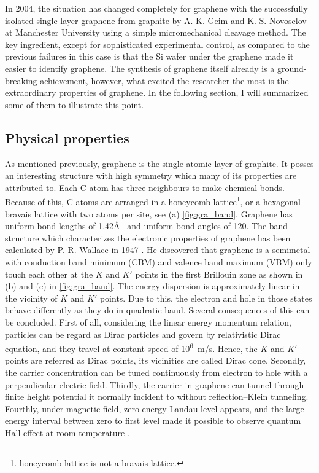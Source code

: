 In 2004, the situation has changed completely for graphene with the successfully isolated single layer graphene from graphite by A. K. Geim and K. S. Novoselov at Manchester University using a simple micromechanical cleavage method. The key ingredient, except for sophisticated experimental control, as compared to the previous failures\cite{Krishnan1997,Ohashi1997} in this case is that the Si wafer under the graphene made it easier to identify graphene\cite{Geim2007}. The synthesis of graphene itself already is a ground-breaking achievement, however, what excited the researcher the most is the extraordinary properties of graphene. In the following section, I will summarized some of them to illustrate this point.

\subsection{Physical properties}

As mentioned previously, graphene is the single atomic layer of graphite. It posses an interesting structure with high symmetry which many of its properties are attributed to. Each C atom has three neighbours to make chemical bonds. Because of this, C atoms are arranged in a honeycomb lattice\footnote{honeycomb lattice is not a bravais lattice.}, or a hexagonal bravais lattice with two atoms per site, see (a) \autoref{fig:gra_band}. Graphene has uniform bond lengths of 1.42\AA~ and uniform bond angles of 120\textdegree. The band structure which characterizes the electronic properties of graphene has been calculated by P. R. Wallace in 1947 \cite{Wallace1947}. He discovered that graphene is a semimetal with conduction band minimum (CBM) and valence band maximum (VBM) only touch each other at the $K$ and $K'$ points in the first Brillouin zone as shown in (b) and (c) in \autoref{fig:gra_band}. The energy dispersion is approximately linear in the vicinity of $K$ and $K'$ points. Due to this, the electron and hole in those states behave differently as they do in quadratic band. Several consequences of this can be concluded. First of all, considering the linear energy momentum relation, particles can be regard as Dirac particles and govern by relativistic Dirac equation\cite{Novoselov2005}, and they travel at constant speed of \si{10^6m/s}. Hence, the $K$ and $K'$ points are referred as Dirac points, its vicinities are called Dirac cone. Secondly, the carrier concentration can be tuned continuously from electron to hole with a perpendicular electric field\cite{Geim2007}. Thirdly, the carrier in graphene can tunnel through finite height potential it normally incident to without reflection--Klein tunneling\cite{Katsnelson2006}. Fourthly, under magnetic field, zero energy Landau level appears, and the large energy interval between zero to first level made it possible to observe quantum Hall effect at room temperature \cite{Novoselov1379}. 

